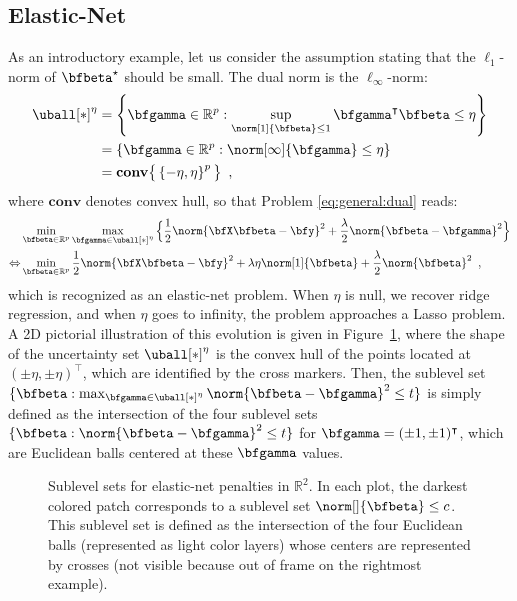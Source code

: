 \subsection{Elastic-Net} \label{sec:elasticnet}

As an introductory example, let us consider the assumption stating that the
$\ell_1$-norm of $\bfbeta^\star$ should be small. 
The dual norm is the $\ell_\infty$-norm:
%
\begin{align*}
  \uball[*]^\eta & = \left\{ \bfgamma \in \mathbb{R}^p :
\sup_{\norm[1]{\bfbeta}\leq1} \bfgamma^\intercal\bfbeta \leq \eta \right\} \\
    & = \left\{ \bfgamma \in \mathbb{R}^p : \norm[\infty]{\bfgamma} \leq \eta \right\} \\
    & = \mathbf{conv} \big\{ \left\{ -\eta, \eta \right\}^p \big\}
  \enspace,
\end{align*}
where $\mathbf{conv}$ denotes convex hull, so that Problem
\eqref{eq:general:dual} reads:
%
\begin{align}
  & \min_{\bfbeta\in\mathbb{R}^p} \max_{\bfgamma \in\uball[*]^\eta}
      \Big\{ \frac{1}{2} \norm{\bfX \bfbeta - \bfy}^2 + \frac{\lambda}{2} \norm{\bfbeta - \bfgamma}^2 
      \Big\} \nonumber \\
  \Leftrightarrow
    & \min_{\bfbeta\in\mathbb{R}^p}
       \frac{1}{2} \norm{\bfX \bfbeta - \bfy}^2 + \lambda \eta
       \norm[1]{\bfbeta} + \frac{\lambda}{2} \norm{\bfbeta}^2
  \enspace, \label{eq:elastic-net}
\end{align}
%
which is recognized as an elastic-net problem.
When $\eta$ is null, we recover ridge regression, and when $\eta$ goes to 
infinity, the problem approaches a Lasso problem.
A 2D pictorial illustration of this evolution is given in
Figure~\ref{fig:en-penalty}, where the shape of the uncertainty set
$\uball[*]^\eta$ is the convex hull of the points located at 
$(\pm \eta, \pm \eta)^\intercal$, which are identified by the cross markers.
Then, the sublevel set 
$\{\bfbeta : \max_{\bfgamma \in \uball[*]^\eta} \norm{\bfbeta-\bfgamma}^2 \leq t\}$
is simply defined as the intersection of the four sublevel sets
$\{\bfbeta : \norm{\bfbeta - \bfgamma}^2 \leq t\}$ for $\bfgamma=(\pm
1, \pm 1)^\intercal$, which are Euclidean balls centered at
these $\bfgamma$ values.
%
\begin{figure}
  \begin{center} 
    \caption{Sublevel sets for elastic-net penalties in $\mathbb{R}^2$.
             In each plot, the darkest colored patch corresponds to a sublevel set $\norm[]{\bfbeta} \leq c$.  
             This sublevel set is defined as the intersection of the four Euclidean balls
             (represented as light color layers) whose centers are
             represented by crosses (not visible because out of frame on the 
             rightmost example).}
    \label{fig:en-penalty}
    \end{center} 
\end{figure} 


